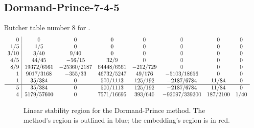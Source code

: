 \documentclass[letterpaper,10pt,english]{sphinxmanual}
\begin{document}
\subsection{Dormand-Prince-7-4-5}
\label{Butcher:dormand-prince-7-4-5}\label{Butcher:butcher-dormand-prince}
Butcher table number 8
for {\hyperref[c_interface/User_callable:c.ARKodeSetERKTableNum]{\emph{}}}.
\begin{gather}
\begin{split}\begin{array}{r|ccccccc}
  0 & 0 & 0 & 0 & 0 & 0 & 0 & 0 \\
  1/5 & 1/5 & 0 & 0 & 0 & 0 & 0 & 0 \\
  3/10 & 3/40 & 9/40 & 0 & 0 & 0 & 0 & 0 \\
  4/5 & 44/45 & -56/15 & 32/9 & 0 & 0 & 0 & 0 \\
  8/9 & 19372/6561 & -25360/2187 & 64448/6561 & -212/729 & 0 & 0 & 0 \\
  1 & 9017/3168 & -355/33 & 46732/5247 & 49/176 & -5103/18656 & 0 & 0 \\
  1 & 35/384 & 0 & 500/1113 & 125/192 & -2187/6784 & 11/84 & 0 \\
  \hline
  5 & 35/384 & 0 & 500/1113 & 125/192 & -2187/6784 & 11/84 & 0 \\
  4 & 5179/57600 & 0 & 7571/16695 & 393/640 & -92097/339200 & 187/2100 & 1/40
\end{array}\end{split}\notag
\end{gather}\begin{figure}[htbp]
\centering
\capstart

\caption{Linear stability region for the Dormand-Prince method.  The method's
region is outlined in blue; the embedding's region is in red.}\end{figure}
\end{document}
